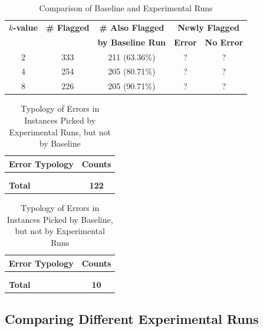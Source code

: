 \begin{table}[H]
    \centering
    \begin{tabular}{|c||c|c|c|c|}
    \hline
    \multicolumn{1}{|c||}{\textbf{\(k\)-value}} &
    \multicolumn{1}{c|}{\textbf{\# Flagged}} &
    \multicolumn{1}{c|}{\textbf{\# Also Flagged}} &
    \multicolumn{2}{c|}{\textbf{Newly Flagged}}\\
     & & \textbf{by Baseline Run} & \textbf{Error} & \textbf{No Error}\\
    \hline
    2 & 333 & 211 (63.36\%) & ? & ?\\
    4 & 254 & 205 (80.71\%) & ? & ?\\
    8 & 226 & 205 (90.71\%) & ? & ?\\
    \hline
    \end{tabular}
    \caption{Comparison of Baseline and Experimental Runs}
    \label{tab:test_lisca}
\end{table}

\begin{table}[H]
    \centering
    \begin{tabular}{|l|c|}
    \hline
    \textbf{Error Typology} & \textbf{Counts}\\
    \hline
         &  \\
         &  \\
    \hline
    \textbf{Total} & \textbf{122}\\
    \hline
    \end{tabular}
    \caption{Typology of Errors in Instances Picked by Experimental Runs, but not by Baseline}
    \label{tab:typology_experimental_not_baseline}
\end{table}


\begin{table}[H]
    \centering
    \begin{tabular}{|l|c|}
    \hline
    \textbf{Error Typology} & \textbf{Counts}\\
    \hline
         &  \\
         &  \\
    \hline
    \textbf{Total} & \textbf{10}\\
    \hline
    \end{tabular}
    \caption{Typology of Errors in Instances Picked by Baseline, but not by Experimental Runs}
    \label{tab:typology_baseline_not_experimental}
\end{table}


\subsection{Comparing Different Experimental Runs}
\label{analysis:all}

